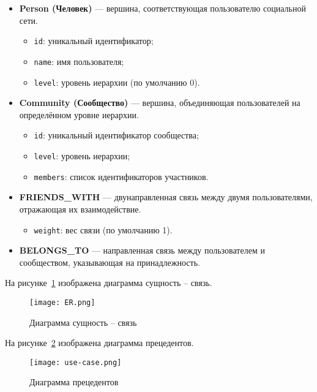 \begin{itemize}
    \item \textbf{Person (Человек)} — вершина, соответствующая пользователю социальной сети.
    \begin{itemize}
        \item \texttt{id}: уникальный идентификатор;
        \item \texttt{name}: имя пользователя;
        \item \texttt{level}: уровень иерархии (по умолчанию 0).
    \end{itemize}
    
    \item \textbf{Community (Сообщество)} — вершина, объединяющая пользователей на определённом уровне иерархии.
    \begin{itemize}
        \item \texttt{id}: уникальный идентификатор сообщества;
        \item \texttt{level}: уровень иерархии;
        \item \texttt{members}: список идентификаторов участников.
    \end{itemize}
    
    \item \textbf{FRIENDS\_WITH} — двунаправленная связь между двумя пользователями, отражающая их взаимодействие.
    \begin{itemize}
        \item \texttt{weight}: вес связи (по умолчанию 1).
    \end{itemize}
    
    \item \textbf{BELONGS\_TO} — направленная связь между пользователем и сообществом, указывающая на принадлежность.
\end{itemize}

На рисунке~\ref{fig:er} изображена диаграмма сущность -- связь.

\begin{figure}[H]
	\centering
	\texttt{[image: ER.png]}
	\caption{Диаграмма сущность -- связь}
	\label{fig:er}
\end{figure}

\clearpage

На рисунке~\ref{fig:use-case} изображена диаграмма прецедентов.

\begin{figure}[H]
	\centering
	\texttt{[image: use-case.png]}
	\caption{Диаграмма прецедентов}
	\label{fig:use-case}
\end{figure}

